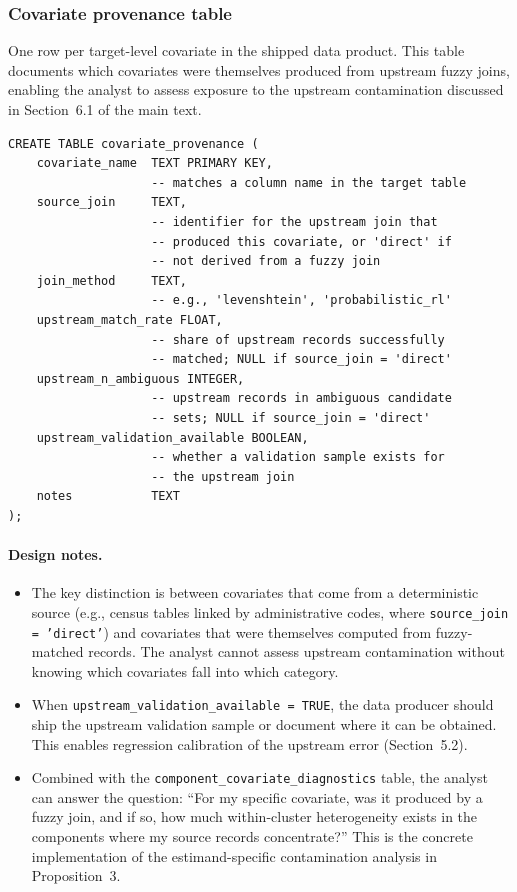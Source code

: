 \subsubsection{Covariate provenance table}

One row per target-level covariate in the shipped data product. This table documents which covariates were themselves produced from upstream fuzzy joins, enabling the analyst to assess exposure to the upstream contamination discussed in Section~6.1 of the main text.

\begin{lstlisting}[style=sql]
CREATE TABLE covariate_provenance (
    covariate_name  TEXT PRIMARY KEY,
                    -- matches a column name in the target table
    source_join     TEXT,
                    -- identifier for the upstream join that
                    -- produced this covariate, or 'direct' if
                    -- not derived from a fuzzy join
    join_method     TEXT,
                    -- e.g., 'levenshtein', 'probabilistic_rl'
    upstream_match_rate FLOAT,
                    -- share of upstream records successfully
                    -- matched; NULL if source_join = 'direct'
    upstream_n_ambiguous INTEGER,
                    -- upstream records in ambiguous candidate
                    -- sets; NULL if source_join = 'direct'
    upstream_validation_available BOOLEAN,
                    -- whether a validation sample exists for
                    -- the upstream join
    notes           TEXT
);
\end{lstlisting}

\paragraph{Design notes.}
\begin{itemize}
    \item The key distinction is between covariates that come from a deterministic source (e.g., census tables linked by administrative codes, where \texttt{source\_join = 'direct'}) and covariates that were themselves computed from fuzzy-matched records. The analyst cannot assess upstream contamination without knowing which covariates fall into which category.
    \item When \texttt{upstream\_validation\_available = TRUE}, the data producer should ship the upstream validation sample or document where it can be obtained. This enables regression calibration of the upstream error (Section~5.2).
    \item Combined with the \texttt{component\_covariate\_diagnostics} table, the analyst can answer the question: ``For my specific covariate, was it produced by a fuzzy join, and if so, how much within-cluster heterogeneity exists in the components where my source records concentrate?'' This is the concrete implementation of the estimand-specific contamination analysis in Proposition~3.
\end{itemize}

